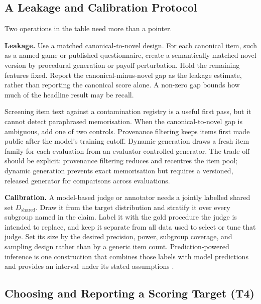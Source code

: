 \documentclass[11pt]{article}
\begin{document}
\subsection{A Leakage and Calibration Protocol}
\label{app:leakcal}

Two operations in the table need more than a pointer.

\textbf{Leakage.} Use a matched canonical-to-novel design. For each canonical
item, such as a named game or published questionnaire, create a semantically
matched novel version by procedural generation or payoff perturbation. Hold the
remaining features fixed. Report the canonical-minus-novel gap as the leakage
estimate, rather than reporting the canonical score alone. A non-zero gap bounds
how much of the headline result may be recall.

Screening item text against a contamination registry \cite{sainz2023nlp} is a
useful first pass, but it cannot detect paraphrased memorisation. When the
canonical-to-novel gap is ambiguous, add one of two controls. Provenance
filtering keeps items first made public after the model's training cutoff.
Dynamic generation draws a fresh item family for each evaluation from an
evaluator-controlled generator. The trade-off should be explicit: provenance
filtering reduces and recentres the item pool; dynamic generation prevents exact
memorisation but requires a versioned, released generator for comparisons across
evaluations.

\textbf{Calibration.} A model-based judge or annotator needs a jointly labelled
shared set $D_{\text{shared}}$. Draw it from the target distribution and stratify
it over every subgroup named in the claim. Label it with the gold procedure the
judge is intended to replace, and keep it separate from all data used to select
or tune that judge. Set its size by the desired precision, power, subgroup
coverage, and sampling design rather than by a generic item count.
Prediction-powered inference is one construction that combines those labels
with model predictions and provides an interval under its stated assumptions
\cite{angelopoulos2023ppi}.

\subsection{Choosing and Reporting a Scoring Target (T4)}
\label{app:scoringtarget}
\end{document}
